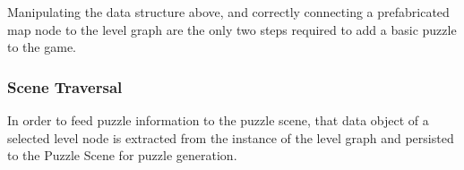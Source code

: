 Manipulating the data structure above, and correctly connecting a prefabricated map node to the level graph are the only two steps required to add a basic puzzle to the game.

\subsubsection{Scene Traversal}
In order to feed puzzle information to the puzzle scene, that data object of a selected level node is extracted from the instance of the level graph and persisted to the Puzzle Scene for puzzle generation.